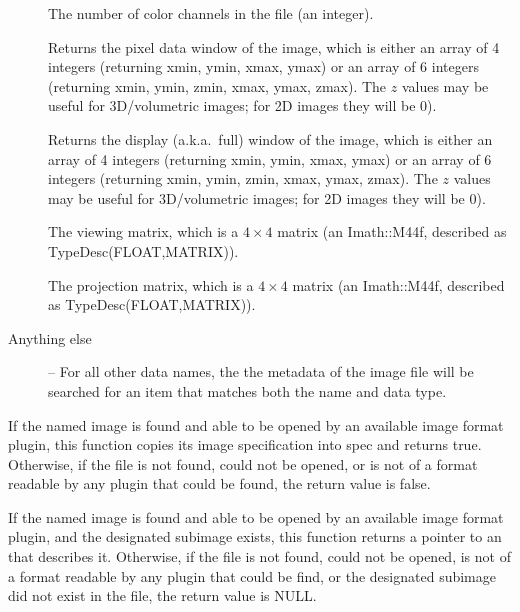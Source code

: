 \begin{description}
\item[\rm {}] The number of color channels in the file 
(an integer).

\item[\rm {}] 
Returns the pixel data window of the image, which is either an array of 4
integers (returning xmin, ymin, xmax, ymax) or an array of 6 integers
(returning xmin, ymin, zmin, xmax, ymax, zmax). The $z$ values may be useful
for 3D/volumetric images; for 2D images they will be 0).

\item[\rm {}] 
Returns the display (a.k.a.\ full) window of the image, which is either an
array of 4 integers (returning xmin, ymin, xmax, ymax) or an array of 6
integers (returning xmin, ymin, zmin, xmax, ymax, zmax). The $z$ values may
be useful for 3D/volumetric images; for 2D images they will be 0).

\item[\rm {}] The viewing matrix, which is a
$4 \times 4$ matrix (an {\cf Imath::M44f}, described as {\cf
  TypeDesc(FLOAT,MATRIX)}).

\item[\rm {}] The projection matrix, which is a
$4 \times 4$ matrix (an {\cf Imath::M44f}, described as {\cf
  TypeDesc(FLOAT,MATRIX)}).

\item[Anything else] -- For all other data names, the
the metadata of the image file will be searched for an item that
matches both the name and data type.

\end{description}
\apiend


If the named image is found and able to be opened by an available
image format plugin, this function copies its image specification into
{\cf spec} and returns {\cf true}.  Otherwise, if the file is not
found, could not be opened, or is not of a format readable by any
plugin that could be found, the return value is {\cf false}.
\apiend



If the named image is found and able to be opened by an available
image format plugin, and the designated subimage exists, this function
returns a pointer to an \ImageSpec that describes it.  Otherwise, if the
file is not found, could not be opened, is not of a format readable by
any plugin that could be find, or the designated subimage did
not exist in the file, the return value is NULL.


